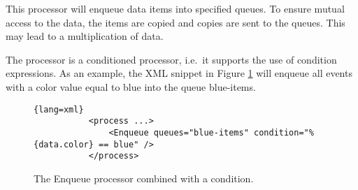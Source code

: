 
This processor will enqueue data items into specified queues. To
ensure mutual access to the data, the items are copied and copies are
sent to the queues. This may lead to a multiplication of data.

The processor is a conditioned processor, i.e.~it supports the use of
condition expressions. As an example, the XML snippet in Figure
\ref{fig:ex:Enqueue} will enqueue all events with a {\ttfamily color}
value equal to {\ttfamily blue} into the queue {\ttfamily blue-items}.

\begin{figure}[h!]
        \centering
        \begin{lstlisting}{lang=xml}
           <process ...>
               <Enqueue queues="blue-items" condition="%{data.color} == blue" />
           </process>
        \end{lstlisting}
        \caption{\label{fig:ex:Enqueue}The {\ttfamily Enqueue} processor combined with a condition.}
\end{figure}


\begin{table}[h]
\end{table}
\clearpage